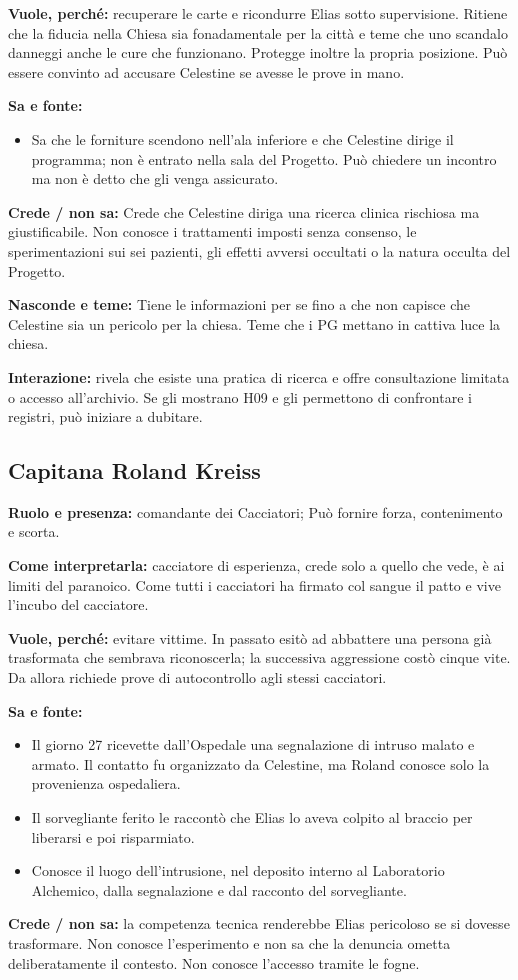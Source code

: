 \documentclass[11pt,a4paper]{article}
\begin{document}
\textbf{Vuole, perché:} recuperare le carte e ricondurre Elias sotto supervisione. Ritiene che la fiducia nella Chiesa sia fonadamentale per la città e teme che uno scandalo danneggi anche le cure che funzionano. Protegge inoltre la propria posizione. Può essere convinto ad accusare Celestine se avesse le prove in mano.

\textbf{Sa e fonte:}
\begin{itemize}
\item Sa che le forniture scendono nell'ala inferiore e che Celestine dirige il programma; non è entrato nella sala del Progetto. Può chiedere un incontro ma non è detto che gli venga assicurato.
\end{itemize}
\textbf{Crede / non sa:} Crede che Celestine diriga una ricerca clinica rischiosa ma giustificabile. Non conosce i trattamenti imposti senza consenso, le sperimentazioni sui sei pazienti, gli effetti avversi occultati o la natura occulta del Progetto.

\textbf{Nasconde e teme:} Tiene le informazioni per se fino a che non capisce che Celestine sia un pericolo per la chiesa. Teme che i PG mettano in cattiva luce la chiesa.

\textbf{Interazione:} rivela che esiste una pratica di ricerca e offre consultazione limitata o accesso all'archivio. Se gli mostrano H09 e gli permettono di confrontare i registri, può iniziare a dubitare.

\subsection{Capitana Roland Kreiss}
\textbf{Ruolo e presenza:} comandante dei Cacciatori;
Può fornire forza, contenimento e scorta.\par
\textbf{Come interpretarla:} cacciatore di esperienza, crede solo a quello che vede, è ai limiti del paranoico. Come tutti i cacciatori ha firmato col sangue il patto e vive l'incubo del cacciatore.

\textbf{Vuole, perché:} evitare vittime. In passato esitò ad abbattere una persona già trasformata che sembrava riconoscerla; la successiva aggressione costò cinque vite. Da allora richiede prove di autocontrollo agli stessi cacciatori.

\textbf{Sa e fonte:}
\begin{itemize}
\item Il giorno 27 ricevette dall'Ospedale una segnalazione di intruso malato e armato. Il contatto fu organizzato da Celestine, ma Roland conosce solo la provenienza ospedaliera.
\item Il sorvegliante ferito le raccontò che Elias lo aveva colpito al braccio per liberarsi e poi risparmiato.
\item Conosce il luogo dell'intrusione, nel deposito interno al Laboratorio Alchemico, dalla segnalazione e dal racconto del sorvegliante.
\end{itemize}
\textbf{Crede / non sa:} la competenza tecnica renderebbe Elias pericoloso se si dovesse trasformare. Non conosce l'esperimento e non sa che la denuncia ometta deliberatamente il contesto. Non conosce l'accesso tramite le fogne.
\end{document}
